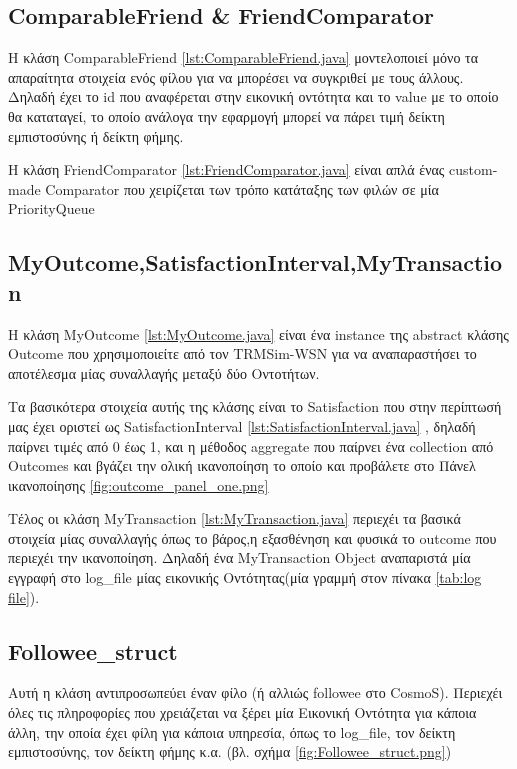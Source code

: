 
\subsection{ComparableFriend \& FriendComparator}
 Η κλάση ComparableFriend \ref{lst:ComparableFriend.java} μοντελοποιεί μόνο τα απαραίτητα στοιχεία ενός φίλου για να μπορέσει να συγκριθεί με τους άλλους. Δηλαδή έχει το id που αναφέρεται στην εικονική οντότητα και το value με το οποίο θα καταταγεί, το οποίο ανάλογα την εφαρμογή μπορεί να πάρει τιμή δείκτη εμπιστοσύνης ή δείκτη φήμης.

 
Η κλάση FriendComparator \ref{lst:FriendComparator.java} είναι απλά ένας custom-made Comparator που χειρίζεται των τρόπο κατάταξης των φιλών σε μία PriorityQueue
 
 
\newpage


\subsection{MyOutcome,SatisfactionInterval,MyTransaction}

Η κλάση MyOutcome \ref{lst:MyOutcome.java} είναι ένα instance της abstract κλάσης Outcome που χρησιμοποιείτε από τον TRMSim-WSN για να αναπαραστήσει το αποτέλεσμα μίας συναλλαγής μεταξύ δύο Οντοτήτων.
 
 
  Τα βασικότερα στοιχεία αυτής της κλάσης είναι το Satisfaction που στην περίπτωσή μας έχει οριστεί ως SatisfactionInterval  \ref{lst:SatisfactionInterval.java} , δηλαδή παίρνει τιμές από 0 έως 1, και η μέθοδος aggregate  που παίρνει ένα collection από Outcomes και βγάζει την ολική ικανοποίηση το οποίο και προβάλετε στο Πάνελ ικανοποίησης \ref{fig:outcome_panel_one.png}

Tέλος οι κλάση MyTransaction \ref{lst:MyTransaction.java} περιεχέι τα βασικά στοιχεία μίας συναλλαγής όπως το βάρος,η εξασθένηση και φυσικά το outcome που περιεχέι την ικανοποίηση. Δηλαδή ένα MyTransaction Object αναπαριστά μία εγγραφή στο log\_file μίας εικονικής Οντότητας(μία γραμμή στον πίνακα \ref{tab:log file}).


\subsection{Followee\_struct}
Αυτή η κλάση αντιπροσωπεύει έναν φίλο (ή αλλιώς followee στο CosmoS). Περιεχέι όλες τις πληροφορίες που χρειάζεται να ξέρει μία Εικονική Οντότητα για κάποια άλλη, την οποία έχει φίλη για κάποια υπηρεσία, όπως το log\_file, τον δείκτη εμπιστοσύνης, τον δείκτη φήμης κ.α. (βλ. σχήμα \ref{fig:Followee_struct.png})

